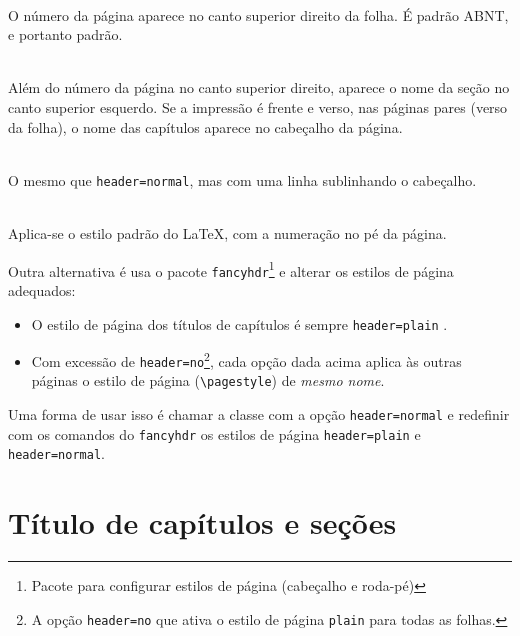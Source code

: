 \documentclass[espaco=simples,appendix=Name]{abnt}
\newcommand{\descrtype}{descriptionbf}
\renewenvironment{description}%
  {\expandafter\csname\descrtype\endcsname\edef\enddescrtype{end\descrtype}}
  {\expandafter\csname\enddescrtype\endcsname}
\newcommand{\abnt}{{\smaller ABNT}}%
\begin{document}
\def\descrtype{descriptiontt}
\begin{description}

\item[header=plain]\ \\
  O número da página aparece no canto superior direito da folha. É padrão
  \abnt{}, e portanto padrão.

\item[header=normal]\ \\
  Além do número da página no canto superior direito, aparece o
  nome da seção no canto superior esquerdo. Se a impressão é frente e
  verso, nas páginas pares (verso da folha), o nome das capítulos aparece
  no cabeçalho da página.

\item[header=ruled]\ \\
  O mesmo que \texttt{header=normal}, mas com uma linha sublinhando o cabeçalho.

\item[header=no]\ \\
  Aplica-se o estilo padrão do \LaTeX, com a numeração no pé da página.

\end{description}

Outra alternativa é usa o pacote
\texttt{fancyhdr}\footnote{Pacote para configurar
  estilos de página (cabeçalho e roda-pé)} e alterar os estilos de página adequados: 


\begin{itemize}

\item O estilo de página dos títulos de capítulos é sempre
  \texttt{header=plain} .

\item Com excessão de \texttt{header=no}\footnote{A opção
    \texttt{header=no} que ativa o estilo de página \texttt{plain} para
    todas as folhas.}, cada opção dada acima aplica às
  outras páginas o estilo de página (\verb+\pagestyle+) de \emph{mesmo
    nome}. 

\end{itemize}


Uma forma de usar isso é chamar a classe com a opção \texttt{header=normal} e
redefinir com os comandos do \texttt{fancyhdr} os estilos de página
\texttt{header=plain} e \texttt{header=normal}.

\section{Título de capítulos e seções}
\end{document}
